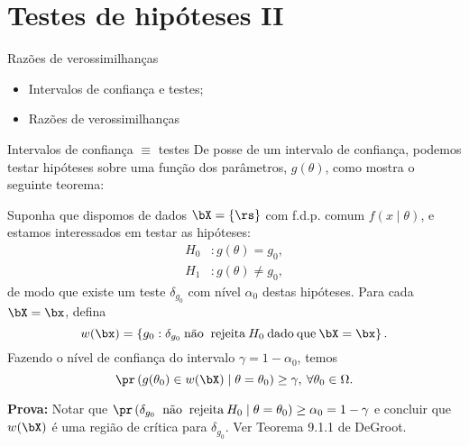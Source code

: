 \section{Testes de hipóteses II}
\begin{frame}{Razões de verossimilhanças}
 \begin{itemize}
   \item Intervalos de confiança e testes;
   \item Razões de verossimilhanças
   \end{itemize}
\end{frame}

\begin{frame}{Intervalos de confiança $\equiv$ testes}
 De posse de um intervalo de confiança, podemos testar hipóteses sobre uma função dos parâmetros, $g(\theta)$, como mostra o seguinte teorema:
 \begin{theo}
 \label{thm:CIs_are_tests}
  Suponha que dispomos de dados $\bX = \{ \rs \}$ com f.d.p. comum $f(x \mid \theta)$, e estamos interessados em testar as hipóteses:
  \begin{align*}
   H_0 &: g(\theta) = g_0, \\
   H_1&: g(\theta) \neq g_0,
  \end{align*}
de modo que existe um teste $\delta_{g_0}$ com nível $\alpha_0$ destas hipóteses. 
Para cada $\bX = \bx$, defina
\[ w(\bx) = \left\{g_0: \delta_{g_0} \text{\:não\: rejeita\:} H_0\text{\:dado\:que\:} \bX = \bx \right\}.\]
Fazendo o nível de confiança do intervalo $\gamma = 1 -\alpha_0$, temos 
\[ \pr\left(g(\theta_0) \in w(\bX) \mid \theta = \theta_0 \right)  \geq \gamma,\: \forall \theta_0 \in \Omega. \]
 \end{theo}
\textbf{Prova:} Notar que $\pr\left(\delta_{g_0} \text{\: não\: rejeita\:} H_0 \mid \theta = \theta_0\right) \geq \alpha_0 = 1-\gamma$ e concluir que $w(\bX)$ é uma região de crítica para $\delta_{g_0}$.
Ver Teorema 9.1.1 de DeGroot.
\end{frame}

